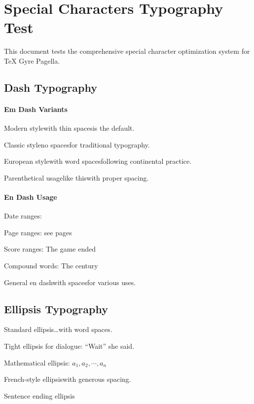 \documentclass[11pt]{article}
\begin{document}
\section{Special Characters Typography Test}

This document tests the comprehensive special character optimization system for TeX Gyre Pagella.

\subsection{Dash Typography}

\paragraph{Em Dash Variants}

Modern style\emdash with thin spaces\emdash is the default.

Classic style\emdashclassic no spaces\emdashclassic for traditional typography.

European style\emdashopen with word spaces\emdashopen following continental practice.

Parenthetical usage\dashparen like this\dashparen with proper spacing.

\paragraph{En Dash Usage}

Date ranges: 

Page ranges: see pages 

Score ranges: The game ended 

Compound words: The  century

General en dash\endash with spaces\endash for various uses.

\subsection{Ellipsis Typography}

Standard ellipsis\ldots with word spaces.

Tight ellipsis for dialogue: ``Wait\tdots'' she said.

Mathematical ellipsis: $a_1, a_2, \cdots, a_n$

French-style ellipsis\fdots with generous spacing.

Sentence ending ellipsis\edots
\end{document}
